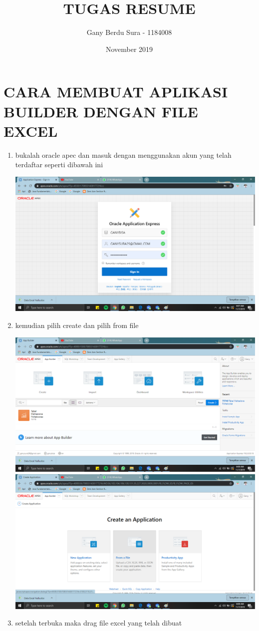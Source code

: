 \documentclass{article}
\title{TUGAS RESUME}
\author{Gany Berdu Sura - 1184008 }
\date{November 2019}
\begin{document}
\maketitle

\section{CARA MEMBUAT APLIKASI BUILDER DENGAN FILE EXCEL} 
\begin{enumerate}
    \item bukalah oracle apec dan masuk dengan menggunakan akun yang telah terdaftar seperti dibawah ini
    \begin{center}
    \includegraphics[width=.6\textwidth]{gambar/1.png}
    \end{center}
    \item kemudian pilih create dan pilih from file
    \begin{center}
    \includegraphics[width=.6\textwidth]{gambar/2.png}
    \includegraphics[width=.6\textwidth]{gambar/3.png}
    \end{center}
    \item setelah terbuka maka drag file excel yang telah dibuat

\end{enumerate}
\end{document}
